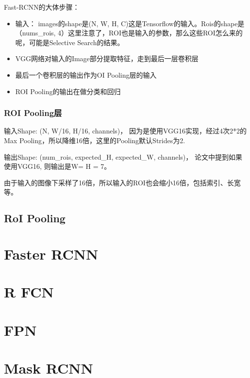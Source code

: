 Fast-RCNN的大体步骤：
\begin{itemize}
\item 输入： images的shape是(N, W, H, C)这是Tensorflow的输入。Rois的shape是（nums\_rois, 4）这里注意了，ROI也是输入的参数，那么这些ROI怎么来的呢，可能是Selective Search的结果。

\item VGG网络对输入的Image部分提取特征，走到最后一层卷积层

\item 最后一个卷积层的输出作为OI Pooling层的输入

\item ROI Pooling的输出在做分类和回归
\end{itemize}

\subsubsection{ROI Pooling层}

输入Shape: (N, W/16, H/16, channels)， 因为是使用VGG16实现，经过4次2*2的Max Pooling，所以降维16倍，这里的Pooling默认Strides为2.

输出Shape: (num\_rois, expected\_H, expected\_W, channels)， 论文中提到如果使用VGG16, 则输出是W= H = 7。

由于输入的图像下采样了16倍，所以输入的ROI也会缩小16倍，包括索引、长宽等。





 
\subsection{RoI Pooling}




\section{Faster RCNN}

\section{R FCN}


\section{FPN}


\section{Mask RCNN}


